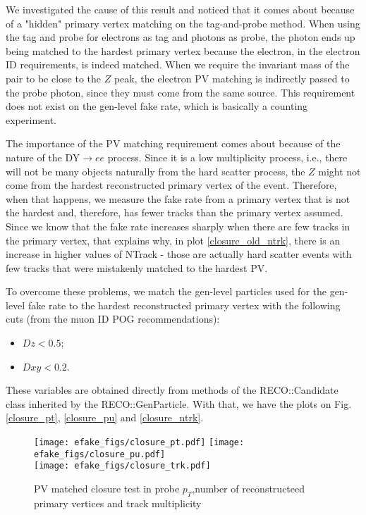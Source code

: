 We investigated the cause of this result and noticed that it comes about because of a "hidden" primary vertex matching on the tag-and-probe method. When using the tag and probe for electrons as tag and photons as probe, the photon ends up being matched to the hardest primary vertex because the electron, in the electron ID requirements, is indeed matched. When we require the invariant mass of the pair to be close to the $Z$ peak, the electron PV matching is indirectly passed to the probe photon, since they must come from the same source. This requirement does not exist on the gen-level fake rate, which is basically a counting experiment.

The importance of the PV matching requirement comes about because of the nature of the DY$\to ee$ process. Since it is a low multiplicity process, i.e., there will not be many objects naturally from the hard scatter process, the $Z$ might not come from the hardest reconstructed primary vertex of the event. Therefore, when that happens, we measure the fake rate from a  primary vertex that is not the hardest and, therefore, has fewer tracks than the primary vertex assumed. Since we know that the fake rate increases sharply when there are few tracks in the primary vertex, that explains why, in plot \ref{closure_old_ntrk}, there is an increase in higher values of NTrack - those are actually hard scatter events with few tracks that were mistakenly matched to the hardest PV.

To overcome these problems, we match the gen-level particles used for the gen-level fake rate to the hardest reconstructed primary vertex with the following cuts (from the muon ID POG recommendations):

\begin{itemize}
\item $Dz < 0.5$;
\item $Dxy < 0.2$.
\end{itemize}

These variables are obtained directly from methods of the RECO::Candidate class inherited by the RECO::GenParticle.
With that, we have the plots on Fig. \ref{closure_pt}, \ref{closure_pu} and \ref{closure_ntrk}.

\begin{figure}[h]
\begin{center}
{\label{closure_pt}\texttt{[image: efake\_figs/closure\_pt.pdf]}}
{\label{closure_pu}\texttt{[image: efake\_figs/closure\_pu.pdf]}}
\\
{\label{closure_ntrk}\texttt{[image: efake\_figs/closure\_trk.pdf]}}
\caption{PV matched closure test in probe $p_T$,number of reconstructeed primary vertices and track multiplicity}
\label{closure_all}
\end{center}
\end{figure}

